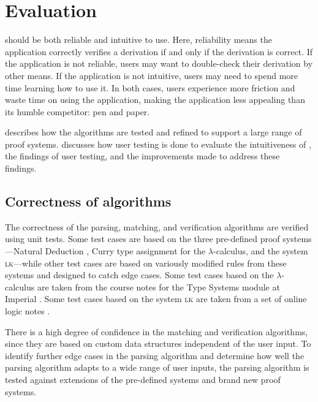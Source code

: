 \chapter{Evaluation}
\projectname{} should be both reliable and intuitive to use. Here, reliability means the application correctly verifies a derivation if and only if the derivation is correct. If the application is not reliable, users may want to double-check their derivation by other means. If the application is not intuitive, users may need to spend more time learning how to use it. In both cases, users experience more friction and waste time on using the application, making the application less appealing than its humble competitor: pen and paper.

 describes how the algorithms are tested and refined to support a large range of proof systems.  discusses how user testing is done to evaluate the intuitiveness of \projectname{}, the findings of user testing, and the improvements made to address these findings.

\section{Correctness of algorithms}
\label{evaluation:correctness}
The correctness of the parsing, matching, and verification algorithms are verified using unit tests. Some test cases are based on the three pre-defined proof systems---Natural Deduction \ndt{}, Curry type assignment for the $\lambda$-calculus, and the system \textsc{lk}---while other test cases are based on variously modified rules from these systems and designed to catch edge cases. Some test cases based on the $\lambda$-calculus are taken from the course notes for the Type Systems module at Imperial \cite{van-bakel:2022}. Some test cases based on the system \textsc{lk} are taken from a set of online logic notes \cite{sequent}.

There is a high degree of confidence in the matching and verification algorithms, since they are based on custom data structures independent of the user input. To identify further edge cases in the parsing algorithm and determine how well the parsing algorithm adapts to a wide range of user inputs, the parsing algorithm is tested against extensions of the pre-defined systems and brand new proof systems.

